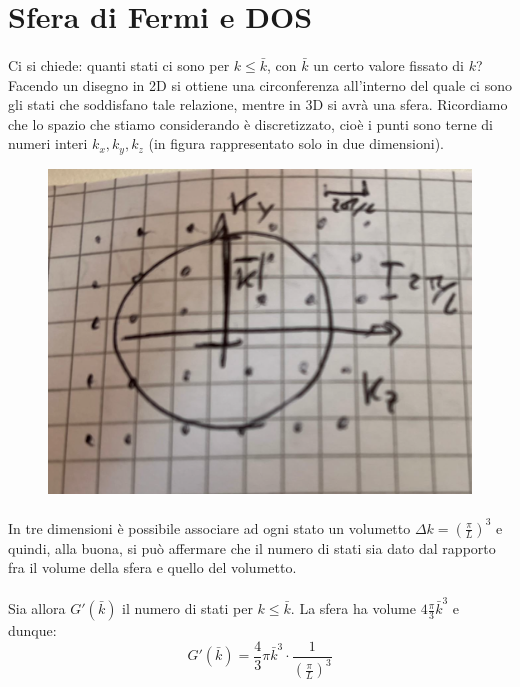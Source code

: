 \documentclass{book}
\begin{document}
        \section{Sfera di Fermi e DOS}
            \paragraph{}
                Ci si chiede: quanti stati ci sono per $k \leq \bar{k}$, con $\bar{k}$ un certo valore fissato di $k$? Facendo un disegno in 2D si ottiene una circonferenza all'interno del quale ci sono gli stati che soddisfano tale relazione, mentre in 3D si avrà una sfera. Ricordiamo che lo spazio che stiamo considerando è discretizzato, cioè i punti sono terne di numeri interi $k_{x}, k_{y}, k_{z}$ (in figura rappresentato solo in due dimensioni).
               \newpage
                \begin{figure}[h!]
                    \centering
                    \includegraphics[width=0.5\linewidth]{img/spazioDiFermiLez12.png}
                \end{figure}
                \paragraph{}
                In tre dimensioni è possibile associare ad ogni stato un volumetto $\displaystyle \Delta k = (\frac{\pi}{L})^{3}$ e quindi, alla buona, si può affermare che il numero di stati sia dato dal rapporto fra il volume della sfera e quello del volumetto.

                \paragraph{}
                    Sia allora $G'(\bar{k})$ il numero di stati per $k \leq \bar{k}$. La sfera ha volume $\displaystyle 4 \frac{\pi}{3}\bar{k}^{3}$ e dunque:
                    $$G'(\bar{k}) = \frac{4}{3}\pi\bar{k}^{3} \cdot \frac{1}{(\frac{\pi}{L})^{3}}$$
\end{document}
